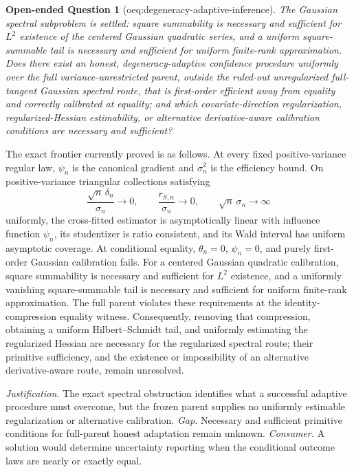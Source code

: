 \documentclass{article}
\newtheorem{openendedquestion}{Open-ended Question}
\begin{document}
\begin{openendedquestion}[oeq:degeneracy-adaptive-inference]\label{oeq:degeneracy-adaptive-inference}
The Gaussian spectral subproblem is settled: square summability is necessary and sufficient for \(L^2\) existence of the centered Gaussian quadratic series, and a uniform square-summable tail is necessary and sufficient for uniform finite-rank approximation. Does there exist an honest, degeneracy-adaptive confidence procedure uniformly over the full variance-unrestricted parent, outside the ruled-out unregularized full-tangent Gaussian spectral route, that is first-order efficient away from equality and correctly calibrated at equality; and which covariate-direction regularization, regularized-Hessian estimability, or alternative derivative-aware calibration conditions are necessary and sufficient?
\end{openendedquestion}
The exact frontier currently proved is as follows.  At every fixed positive-variance regular law, \(\psi_n\) is the canonical gradient and \(\sigma_n^2\) is the efficiency bound.  On positive-variance triangular collections satisfying \[\frac{\sqrt n\,\delta_n}{\sigma_n}\to0,\qquad \frac{r_{S,n}}{\sigma_n}\to0,\qquad \sqrt n\,\sigma_n\to\infty\] uniformly, the cross-fitted estimator is asymptotically linear with influence function \(\psi_n\), its studentizer is ratio consistent, and its Wald interval has uniform asymptotic coverage.  At conditional equality, \(\theta_n=0\), \(\psi_n=0\), and purely first-order Gaussian calibration fails.  For a centered Gaussian quadratic calibration, square summability is necessary and sufficient for \(L^2\) existence, and a uniformly vanishing square-summable tail is necessary and sufficient for uniform finite-rank approximation.  The full parent violates these requirements at the identity-compression equality witness.  Consequently, removing that compression, obtaining a uniform Hilbert--Schmidt tail, and uniformly estimating the regularized Hessian are necessary for the regularized spectral route; their primitive sufficiency, and the existence or impossibility of an alternative derivative-aware route, remain unresolved.
\par\smallskip\noindent \textit{Justification.} The exact spectral obstruction identifies what a successful adaptive procedure must overcome, but the frozen parent supplies no uniformly estimable regularization or alternative calibration. \textit{Gap.} Necessary and sufficient primitive conditions for full-parent honest adaptation remain unknown. \textit{Consumer.} A solution would determine uncertainty reporting when the conditional outcome laws are nearly or exactly equal.
\end{document}
